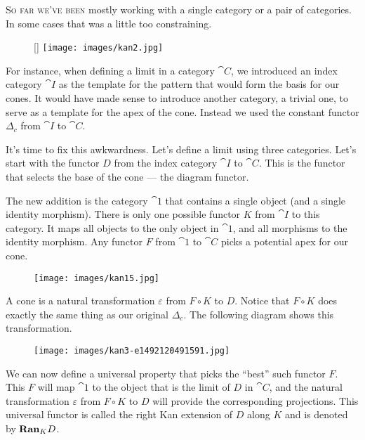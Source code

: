 \lettrine[lhang=0.17]{S}{o far we've been} mostly working with a single category or a pair of
categories. In some cases that was a little too constraining.

\begin{wrapfigure}[8]{R}{0pt}
\raisebox{0pt}[\dimexpr{}\baselineskip\relax]{
\texttt{[image: images/kan2.jpg]}}%
\end{wrapfigure}

For instance, when defining a limit in a category $\cat{C}$, we introduced an
index category $\cat{I}$ as the template for the pattern that would
form the basis for our cones. It would have made sense to introduce
another category, a trivial one, to serve as a template for the apex of
the cone. Instead we used the constant functor $\Delta_c$ from
$\cat{I}$ to $\cat{C}$.

It's time to fix this awkwardness. Let's define a limit using three
categories. Let's start with the functor $D$ from the index
category $\cat{I}$ to $\cat{C}$. This is the functor that selects the base
of the cone --- the diagram functor.

The new addition is the category $\cat{1}$ that contains a single
object (and a single identity morphism). There is only one possible
functor $K$ from $\cat{I}$ to this category. It maps all objects
to the only object in $\cat{1}$, and all morphisms to the identity
morphism. Any functor $F$ from $\cat{1}$ to $\cat{C}$ picks a
potential apex for our cone.

\begin{figure}[H]
\centering
\texttt{[image: images/kan15.jpg]}
\end{figure}

\noindent
A cone is a natural transformation $\varepsilon$ from $F \circ K$ to
$D$. Notice that $F \circ K$ does exactly the same thing as
our original $\Delta_c$. The following diagram shows this
transformation.

\begin{figure}[H]
\centering
\texttt{[image: images/kan3-e1492120491591.jpg]}
\end{figure}

\noindent
We can now define a universal property that picks the ``best'' such
functor $F$. This $F$ will map $\cat{1}$ to the object
that is the limit of $D$ in $\cat{C}$, and the natural
transformation $\varepsilon$ from $F \circ K$ to $D$ will
provide the corresponding projections. This universal functor is called
the right Kan extension of $D$ along $K$ and is denoted by
$\mathbf{Ran}_{K}D$.

